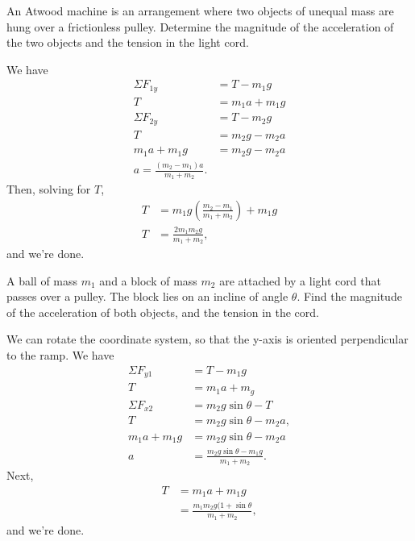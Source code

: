 \documentclass[11pt]{article}
\begin{document}
\begin{example}
	An Atwood machine is an arrangement where two objects of unequal mass are hung over a frictionless pulley. Determine the magnitude of the acceleration of the two objects and the tension in the light cord.
\end{example}
\begin{solution}
We have
\begin{align*}
	\Sigma F_{1y} &= T-m_1g \\
	T &= m_1a + m_1g \\
	\Sigma F_{2y} &= T - m_2g \\
	T &= m_2g - m_2a \\
	m_1a +m_1g &= m_2g - m_2a \\
	a = \frac{(m_2-m_1)a}{m_1+m_2}.
\end{align*}
Then, solving for $T$,
\begin{align*}
	T &= m_1g\left(\frac{m_2-m_1}{m_1+m_2}\right) + m_1g \\
	T &= \frac{2m_1m_2g}{m_1+m_2},
\end{align*}
and we're done.
\end{solution}

\begin{example}
	A ball of mass $m_1$ and a block of mass $m_2$ are attached by a light cord that passes over a pulley. The block lies on an incline of angle $\theta$. Find the magnitude of the acceleration of both objects, and the tension in the cord.
\end{example}
\begin{solution}
We can rotate the coordinate system, so that the y-axis is oriented perpendicular to the ramp. We have
\begin{align*}
	\Sigma F_{y1} &= T-m_1g \\
	T &= m_1a+m_g \\
	\Sigma F_{x2} &= m_2g\sin\theta - T \\
	T &= m_2g\sin\theta - m_2a, \\
	m_1a + m_1g &= m_2g\sin\theta - m_2a \\
	a &= \frac{m_2g\sin\theta - m_1g}{m_1 + m_2}.
\end{align*}
Next,
\begin{align*}
	T &= m_1a+m_1g \\
	&= \frac{m_1m_2g(1+\sin\theta}{m_1+m_2},
\end{align*}
and we're done.
\end{solution}
\end{document}
